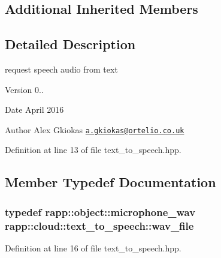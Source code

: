 \subsection*{Additional Inherited Members}


\subsection{Detailed Description}
request speech audio from text 

\begin{DoxyVersion}{Version}
0.. 
\end{DoxyVersion}
\begin{DoxyDate}{Date}
April 2016 
\end{DoxyDate}
\begin{DoxyAuthor}{Author}
Alex Gkiokas \href{mailto:a.gkiokas@ortelio.co.uk}{\tt a.\-gkiokas@ortelio.\-co.\-uk} 
\end{DoxyAuthor}


Definition at line 13 of file text\-\_\-to\-\_\-speech.\-hpp.



\subsection{Member Typedef Documentation}
\hypertarget{classrapp_1_1cloud_1_1text__to__speech_a13ce0c09ae955dc6ad999e85f7ef261a}{
\subsubsection[{wav\-\_\-file}]{\setlength{\rightskip}{0pt plus 5cm}typedef {\bf rapp\-::object\-::microphone\-\_\-wav} {\bf rapp\-::cloud\-::text\-\_\-to\-\_\-speech\-::wav\-\_\-file}}}\label{classrapp_1_1cloud_1_1text__to__speech_a13ce0c09ae955dc6ad999e85f7ef261a}


Definition at line 16 of file text\-\_\-to\-\_\-speech.\-hpp.



